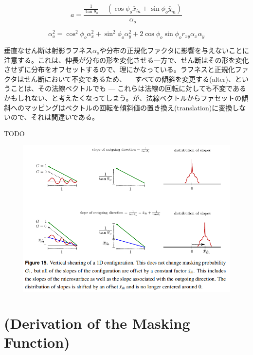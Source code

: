\documentclass[a4j,xelatex,ja=standard]{bxjsarticle}
\begin{document}
\begin{equation}
    a = \frac{\frac{1}{\tan\theta_o} - (\cos\phi_o \bar{x}_{\tilde{m}} + \sin\phi_o \bar{y}_{\tilde{m}})}{\alpha_o}
    \label{eq:96}
\end{equation}

\begin{equation}
    \alpha^2_o = \cos^2 \phi_o \alpha^2_x + \sin^2 \phi_o \alpha^2_y + 2 \cos\phi_o \sin\phi_o r_{xy} \alpha_x \alpha_y
    \label{eq:97}
\end{equation}

垂直なせん断は射影ラフネス$\alpha_o$や分布の正規化ファクタに影響を与えないことに注意する。これは、伸長が分布の形を変化させる一方で、せん断はその形を変化させずに分布をオフセットするので、理にかなっている。ラフネスと正規化ファクタはせん断において不変であるため、--- すべての傾斜を変更する(alter)、ということは、その法線ベクトルでも --- これらは法線の回転に対しても不変であるかもしれない、と考えたくなってしまう。が、法線ベクトルからファセットの傾斜へのマッピングはベクトルの回転を傾斜値の置き換え(translation)に変換しないので、それは間違いである。

TODO

\begin{figure}
    \includegraphics[width=\textwidth]{Figure15.png}
    \caption{}
    \label{fig:15}
\end{figure}

\printbibliography[title=参考文献]

\appendix

\section{(Derivation of the Masking Function)}
\label{sec:A}
\end{document}
